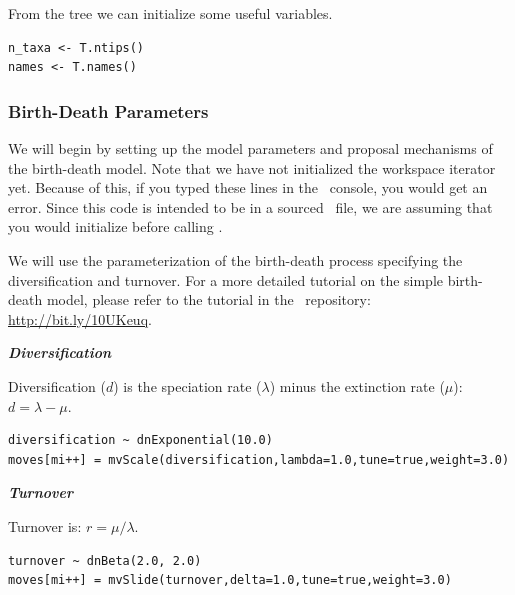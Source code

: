 From the tree we can initialize some useful variables.
{\tt \begin{snugshade*}
\begin{lstlisting}
n_taxa <- T.ntips()
names <- T.names()
\end{lstlisting}
\end{snugshade*}}


\subsubsection{Birth-Death Parameters}

We will begin by setting up the model parameters and proposal mechanisms of the birth-death model. 
Note that we have not initialized the workspace iterator  yet. 
Because of this, if you typed these lines in the \RevBayes~console, you would get an error. 
Since this code is intended to be in a sourced \Rev~file, we are assuming that you would initialize  before calling .

We will use the parameterization of the birth-death process specifying the diversification and turnover.
For a more detailed tutorial on the simple birth-death model, please refer to the tutorial in the \RevBayes~repository: \href{http://bit.ly/10UKeuq}{http://bit.ly/10UKeuq}.

\textbf{\textit{Diversification}}

Diversification ($d$) is the speciation rate ($\lambda$) minus the extinction rate ($\mu$): $d = \lambda - \mu$.
{\tt \begin{snugshade*}
\begin{lstlisting}
diversification ~ dnExponential(10.0) 
moves[mi++] = mvScale(diversification,lambda=1.0,tune=true,weight=3.0)
\end{lstlisting}
\end{snugshade*}}

\textbf{\textit{Turnover}}

Turnover is: $r = \mu / \lambda$.
{\tt \begin{snugshade*}
\begin{lstlisting}
turnover ~ dnBeta(2.0, 2.0) 
moves[mi++] = mvSlide(turnover,delta=1.0,tune=true,weight=3.0)
\end{lstlisting}
\end{snugshade*}}


